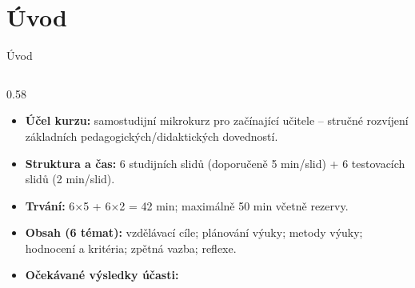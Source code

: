 \documentclass[aspectratio=169]{beamer}
\begin{document}
\section{Úvod}
\begin{frame}{Úvod}
\begin{columns}[T,onlytextwidth]
\begin{column}{0.58\textwidth}
\scriptsize
\begin{itemize}

\tightlist

\item

  \textbf{Účel kurzu:} samostudijní mikrokurz pro začínající učitele -- stručné rozvíjení základních pedagogických/didaktických dovedností.

\end{itemize}


\begin{itemize}

\tightlist

\item

  \textbf{Struktura a čas:} 6 studijních slidů (doporučeně 5 min/slid) + 6 testovacích slidů (2 min/slid).

\end{itemize}


\begin{itemize}

\tightlist

\item

  \textbf{Trvání:} 6×5 + 6×2 = 42 min; maximálně 50 min včetně rezervy.

\end{itemize}


\begin{itemize}

\tightlist

\item

  \textbf{Obsah (6 témat):} vzdělávací cíle; plánování výuky; metody výuky; hodnocení a kritéria; zpětná vazba; reflexe.

\end{itemize}


\begin{itemize}

\tightlist

\item

  \textbf{Očekávané výsledky účasti:}


\end{itemize}
\end{column}
\end{columns}
\end{frame}
\end{document}
